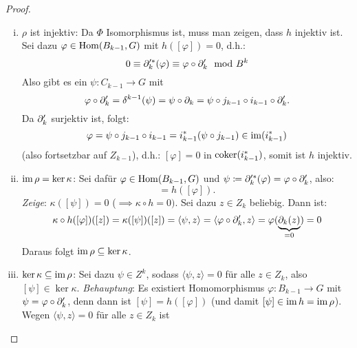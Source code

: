 \begin{proof}
  \begin{enumerate}[(i)]
    \item
      $\rho$ ist injektiv:
      Da $\Phi$ Isomorphismus ist, muss man zeigen, dass $h$ injektiv ist.
      Sei dazu $\varphi \in \mathrm{Hom}(B_{k-1},G)$ mit $h([\varphi]) = 0$, d.h.:
      \begin{equation*}
        0 \equiv \partial_{k}'^*(\varphi) \equiv \varphi \circ \partial_k' \mod B^k
      \end{equation*}
      Also gibt es ein $\psi \colon C_{k-1} \to G$ mit
      \begin{equation*}
        \varphi \circ \partial_k' = \delta^{k-1}(\psi) = \psi \circ \partial_k = \psi \circ j_{k-1} \circ i_{k-1} \circ \partial_k'.
      \end{equation*}
      Da $\partial_k'$ surjektiv ist, folgt:
      \begin{equation*}
        \varphi = \psi \circ j_{k-1} \circ i_{k-1} = i_{k-1}^*(\psi \circ j_{k-1}) \in \operatorname{im}(i_{k-1}^*)
      \end{equation*}
      (also fortsetzbar auf $Z_{k-1}$), d.h.: $[\varphi] = 0$ in $\operatorname{coker}(i_{k-1}^*)$, somit ist $h$ injektiv.
    \item
      $\operatorname{im} \rho = \ker \kappa$:
      Sei dafür $\varphi \in \mathrm{Hom}(B_{k-1},G)$ und $\psi \coloneqq \partial_{k}'^* (\varphi) = \varphi \circ \partial_k'$, also:
      \begin{equation*}
        [\psi] = h([\varphi]).
      \end{equation*}
      \emph{Zeige}: $\kappa([\psi]) = 0$ ($\implies \kappa \circ h = 0)$.
      Sei dazu $z \in Z_k$ beliebig.
      Dann ist:
      \begin{equation*}
        \kappa \circ h ([\varphi])([z]) = \kappa([\psi])([z]) = \langle \psi, z \rangle = \langle \varphi \circ \partial_k', z \rangle = \varphi(\underbrace{\partial_k(z)}_{= 0}) = 0
      \end{equation*}
      Daraus folgt $\operatorname{im} \rho \subseteq \ker \kappa$.
    \item
      $\ker \kappa \subseteq \operatorname{im} \rho$:
      Sei dazu $\psi \in Z^k$, sodass $\langle \psi, z \rangle = 0$ für alle $z \in Z_k$, also $[\psi] \in \ker \kappa$.
      \emph{Behauptung}: Es existiert Homomorphismus $\varphi \colon B_{k-1} \to G$  mit $\psi = \varphi \circ \partial_k'$, denn dann ist $[\psi] = h([\varphi])$ (und damit $[\psi] \in \operatorname{im} h = \operatorname{im} \rho$).
      Wegen $\langle \psi, z \rangle = 0$ für alle $z \in Z_k$ ist
      \begin{equation*}

\end{equation*}
\end{enumerate}
\end{proof}
